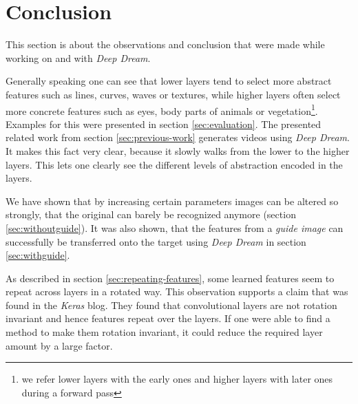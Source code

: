 \section{Conclusion}
\label{sec:conclusion}
This section is about the observations and conclusion that were made while working on and with \textit{Deep Dream}.

Generally speaking one can see that lower layers tend to select more abstract features such as lines, curves, waves or textures, while higher layers often select more concrete features such as eyes, body parts of animals or vegetation\footnote{we refer lower layers with the early ones and higher layers with later ones during a forward pass}.
Examples for this were presented in section \ref{sec:evaluation}.
The presented related work from section \ref{sec:previous-work} generates videos using \textit{Deep Dream}.
It makes this fact very clear, because it slowly walks from the lower to the higher layers.
This lets one clearly see the different levels of abstraction encoded in the layers.

We have shown that by increasing certain parameters images can be altered so strongly, that the original can barely be recognized anymore (section \ref{sec:withoutguide}).
It was also shown, that the features from a \emph{guide image} can successfully be transferred onto the target using \textit{Deep Dream} in section \ref{sec:withguide}.

As described in section \ref{sec:repeating-features}, some learned features seem to repeat across layers in a rotated way.
This observation supports a claim that was found in the \textit{Keras} blog.\cite{keras-blog}
They found that convolutional layers are not rotation invariant and hence features repeat over the layers.
If one were able to find a method to make them rotation invariant, it could reduce the required layer amount by a large factor.
